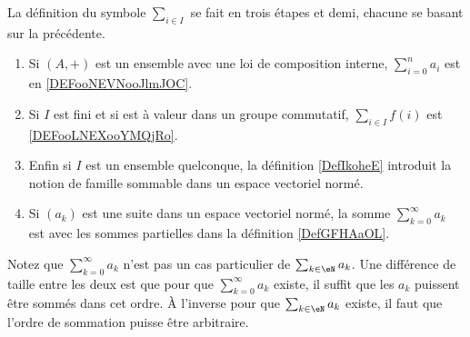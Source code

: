           \label{THEMEooMKLBooLGFCdx}
La définition du symbole \( \sum_{i\in I}\) se fait en trois étapes et demi, chacune se basant sur la précédente.
\begin{enumerate}
    \item
        Si \( (A,+)\) est un ensemble avec une loi de composition interne, \( \sum_{i=0}^na_i\) est en \ref{DEFooNEVNooJlmJOC}.
    \item
        Si \( I\) est fini et si est à valeur dans un groupe commutatif, \( \sum_{i\in I}f(i)\) est \ref{DEFooLNEXooYMQjRo}.
    \item 
        Enfin si \( I\) est un ensemble quelconque, la définition \ref{DefIkoheE} introduit la notion de famille sommable dans un espace vectoriel normé.
    \item
        Si \( (a_k)\) est une suite dans un espace vectoriel normé, la somme \( \sum_{k=0}^{\infty}a_k\) est avec les sommes partielles dans la définition \ref{DefGFHAaOL}.
\end{enumerate}
Notez que \( \sum_{k=0}^{\infty}a_k\) n'est pas un cas particulier de \( \sum_{k\in \eN}a_k\). Une différence de taille entre les deux est que pour que \( \sum_{k=0}^{\infty}a_k\) existe, il suffit que les \( a_k\) puissent être sommés dans cet ordre. À l'inverse pour que \( \sum_{k\in \eN}a_k\) existe, il faut que l'ordre de sommation puisse être arbitraire. 


